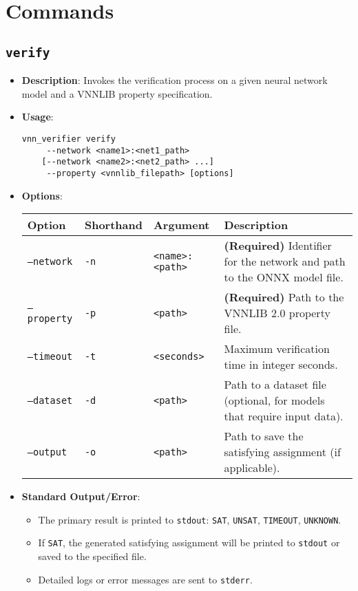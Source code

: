 \section{Commands}

\subsection{\texttt{verify}}
\begin{itemize}
    \item \textbf{Description}: Invokes the verification process on a given neural network model and a VNNLIB property specification.
    \item \textbf{Usage}:
    \begin{lstlisting}[style=bash]
vnn_verifier verify
	 --network <name1>:<net1_path> 
	[--network <name2>:<net2_path> ...] 
	 --property <vnnlib_filepath> [options] \end{lstlisting}
    \item \textbf{Options}:
    \begin{longtable}{@{}>{\raggedright\arraybackslash\ttfamily}p{}%
                    >{\raggedright\arraybackslash\ttfamily}p{}%
                    >{\raggedright\arraybackslash\ttfamily}p{}%
                    >{\raggedright\arraybackslash}p{}@{}}%
        \toprule
        Option & Shorthand & Argument & Description \\
        \midrule
        \bottomrule
        \texttt{--network} & \texttt{-n} & \texttt{<name>:<path>} & \textbf{(Required)} Identifier for the network and path to the ONNX model file. \\
        \texttt{--property} & \texttt{-p} & \texttt{<path>} & \textbf{(Required)} Path to the VNNLIB 2.0 property file. \\
        \texttt{--timeout} & \texttt{-t} & \texttt{<seconds>} & Maximum verification time in integer seconds. \\
        \texttt{--dataset} & \texttt{-d} & \texttt{<path>} & Path to a dataset file (optional, for models that require input data).\\
        \texttt{--output} & \texttt{-o} & \texttt{<path>} & Path to save the satisfying assignment (if applicable). \\
    \end{longtable}
    \item \textbf{Standard Output/Error}:
    \begin{itemize}
        \item The primary result is printed to \texttt{stdout}: \texttt{SAT}, \texttt{UNSAT}, \texttt{TIMEOUT}, \texttt{UNKNOWN}.
        \item If \texttt{SAT}, the generated satisfying assignment will be printed to \texttt{stdout} or saved to the specified file.
        \item Detailed logs or error messages are sent to \texttt{stderr}.
    \end{itemize}
\end{itemize}

